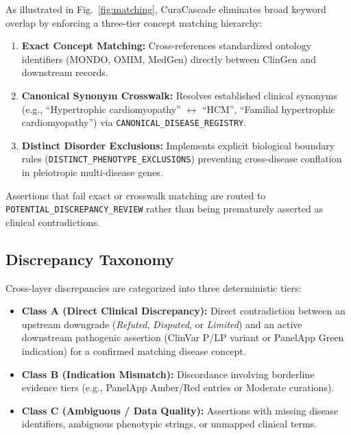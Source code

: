 \documentclass[conference]{IEEEtran}
\begin{document}
As illustrated in Fig.~\ref{fig:matching}, CuraCascade eliminates broad keyword overlap by enforcing a three-tier concept matching hierarchy:
\begin{enumerate}
    \item \textbf{Exact Concept Matching:} Cross-references standardized ontology identifiers (MONDO, OMIM, MedGen) directly between ClinGen and downstream records.
    \item \textbf{Canonical Synonym Crosswalk:} Resolves established clinical synonyms (e.g., ``Hypertrophic cardiomyopathy'' $\leftrightarrow$ ``HCM'', ``Familial hypertrophic cardiomyopathy'') via \texttt{CANONICAL\_DISEASE\_REGISTRY}.
    \item \textbf{Distinct Disorder Exclusions:} Implements explicit biological boundary rules (\texttt{DISTINCT\_PHENOTYPE\_EXCLUSIONS}) preventing cross-disease conflation in pleiotropic multi-disease genes.
\end{enumerate}
Assertions that fail exact or crosswalk matching are routed to \texttt{POTENTIAL\_DISCREPANCY\_REVIEW} rather than being prematurely asserted as clinical contradictions.

\subsection{Discrepancy Taxonomy}
Cross-layer discrepancies are categorized into three deterministic tiers:
\begin{itemize}
    \item \textbf{Class A (Direct Clinical Discrepancy):} Direct contradiction between an upstream downgrade (\textit{Refuted}, \textit{Disputed}, or \textit{Limited}) and an active downstream pathogenic assertion (ClinVar P/LP variant or PanelApp Green indication) for a confirmed matching disease concept.
    \item \textbf{Class B (Indication Mismatch):} Discordance involving borderline evidence tiers (e.g., PanelApp Amber/Red entries or Moderate curations).
    \item \textbf{Class C (Ambiguous / Data Quality):} Assertions with missing disease identifiers, ambiguous phenotypic strings, or unmapped clinical terms.
\end{itemize}
\end{document}
